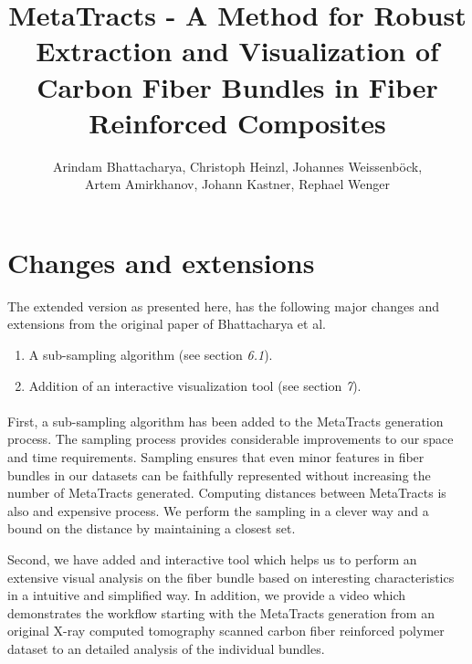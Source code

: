 \documentclass[]{article}
\title{MetaTracts - A Method for Robust Extraction and Visualization of Carbon Fiber Bundles in Fiber Reinforced Composites}
\author{Arindam Bhattacharya, Christoph Heinzl, Johannes Weissenb{\"o}ck,\\Artem Amirkhanov, Johann Kastner, Rephael Wenger}
\begin{document}
\maketitle

\section{Changes and extensions}
The extended version as presented here, has the following major changes and extensions from the original paper of Bhattacharya et al.~\cite{Bhattacharya2015} 
\begin{enumerate}
	\item A sub-sampling algorithm (see section \textit{6.1}).
	\item Addition of an interactive visualization tool (see section \textit{7}).
\end{enumerate}
\paragraph{}
First, a sub-sampling algorithm has been added to the MetaTracts generation process. The sampling process provides considerable improvements to our space and time requirements. Sampling ensures that even minor features in fiber bundles in our datasets can be faithfully represented without increasing the number of MetaTracts generated.
Computing distances between MetaTracts is also and expensive process. We perform the sampling in a clever way and a bound on the distance by maintaining a closest set.
 
Second, we have added and interactive tool which helps us to perform an extensive  visual analysis on the fiber bundle based on interesting characteristics in a intuitive and simplified way. In addition, we provide a video which demonstrates the workflow starting with the MetaTracts generation from an original X-ray computed tomography scanned carbon fiber reinforced polymer dataset to an detailed analysis of the individual bundles. 



\end{document}

